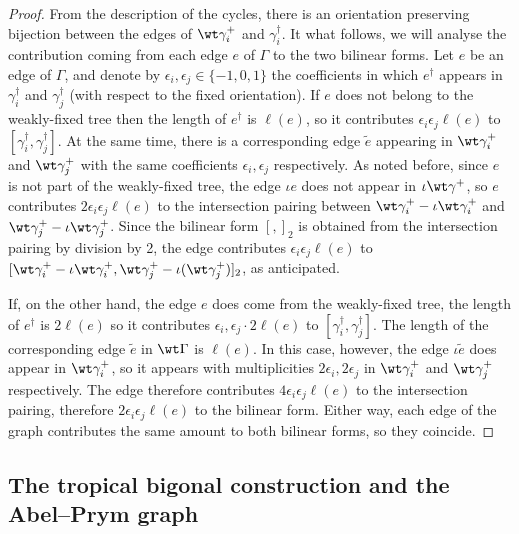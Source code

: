 \begin{proof}
From the description of the cycles, there is an orientation preserving bijection between the edges of $\wt\gamma_i^+$ and $\gamma_i^{\dagger}$. It what follows, we will analyse the contribution coming from each edge $e$ of $\Gamma$ to the two bilinear forms. 
Let $e$ be an edge of $\Gamma$, and denote by $\epsilon_i,\epsilon_j\in\{-1,0,1\}$ the coefficients in which 
 $e^{\dagger}$  appears in $\gamma_i^{\dagger}$ and $\gamma_j^{\dagger}$    (with respect to the fixed orientation). If $e$ does not belong to the weakly-fixed tree then the length of $e^{\dagger}$ is $\ell(e)$, so  it contributes $\epsilon_i\epsilon_j\ell(e)$ to $[\gamma_i^{\dagger},\gamma_j^{\dagger}]$. At the same time, there is a corresponding edge $\tilde e$ appearing in $\wt\gamma_i^{+}$ and $\wt\gamma_j^{+}$ with the same coefficients $\epsilon_i,\epsilon_j$ respectively.  As noted before, since $e$ is not part of the weakly-fixed tree,  the edge $\iota e$ does not appear in $\iota\wt\gamma^+$, so $e$ contributes  $2\epsilon_i\epsilon_j\ell(e)$ to the intersection pairing between $\wt\gamma_i^{+} - \iota\wt\gamma_i^{+}$ and $\wt\gamma_j^{+} - \iota\wt\gamma_j^{+}$. Since the bilinear form $[,]_2$ is obtained from the intersection pairing by division by 2, the edge contributes $\epsilon_i\epsilon_j\ell(e)$ to $[\wt\gamma_i^{+} - \iota\wt\gamma_i^{+}, \wt\gamma_j^{+} - \iota(\wt\gamma_j^{+})]_2$, as anticipated. 

If, on the other hand, the edge $e$ does come from the weakly-fixed tree, the length of $e^{\dagger}$  is $2\ell(e)$ so it contributes $\epsilon_i,\epsilon_j\cdot 2\ell(e)$ to $[\gamma_i^{\dagger},\gamma_j^{\dagger}]$. The length of  the corresponding edge $\tilde e$  in $\wt\Gamma$ is $\ell(e)$. 
In this case, however, the edge $\iota\tilde e$ does appear in $\wt\gamma^{+}_i$, so it appears with multiplicities $2\epsilon_i,2\epsilon_j$ in $\wt\gamma_i^{+}$ and $\wt\gamma_j^{+}$ respectively. The edge therefore contributes  $4\epsilon_i\epsilon_j\ell(e)$ to the intersection pairing, therefore $2\epsilon_i\epsilon_j\ell(e)$ to the bilinear form. Either way, each edge of the graph contributes the same amount to both bilinear forms, so they coincide. 
    \end{proof}



 \subsection{The tropical bigonal construction and the Abel--Prym graph}

